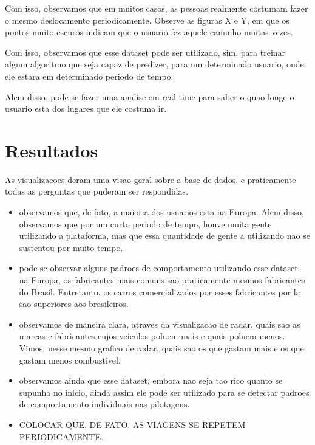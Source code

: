 \documentclass[10pt, conference]{IEEEtran}
\begin{document}
Com isso, observamos que em muitos casos, as pessoas realmente costumam fazer o mesmo deslocamento
periodicamente. Observe as figuras X e Y, em que os pontos muito escuros indicam que o usuario
fez aquele caminho muitas vezes. 

Com isso, observamos que esse dataset pode ser utilizado, sim, para treinar algum algoritmo
que seja capaz de predizer, para um determinado usuario, onde ele estara em determinado periodo 
de tempo.

Alem disso, pode-se fazer uma analise em real time para saber o quao longe o usuario esta dos
lugares que ele costuma ir.






\section{Resultados}
%

As visualizacoes deram uma visao geral sobre a base de dados, e praticamente todas
as perguntas que puderam ser respondidas. 

\begin{itemize}
  
  \item observamos que, de fato, a maioria dos usuarios esta na Europa. Alem disso, observamos
    que por um curto periodo de tempo, houve muita gente utilizando a plataforma, mas que essa
    quantidade de gente a utilizando nao se sustentou por muito tempo.

  \item pode-se observar alguns padroes de comportamento utilizando esse dataset: na Europa, os
    fabricantes mais comuns sao praticamente mesmos fabricantes do Brasil. Entretanto, os carros
    comercializados por esses fabricantes por la sao superiores aos brasileiros.

  \item observamos de maneira clara, atraves da visualizacao de radar, quais sao as marcas
  e fabricantes cujos veiculos poluem mais e quais poluem menos. Vimos, nesse mesmo grafico de radar,  
  quais sao os que gastam mais e os que gastam menos combustivel.

  \item observamos ainda que esse dataset, embora nao seja tao rico quanto se supunha no inicio,
    ainda assim ele pode ser utilizado para se detectar padroes de comportamento individuais 
    nas pilotagens.

  \item COLOCAR QUE, DE FATO, AS VIAGENS SE REPETEM PERIODICAMENTE.

\end{itemize}
\end{document}
